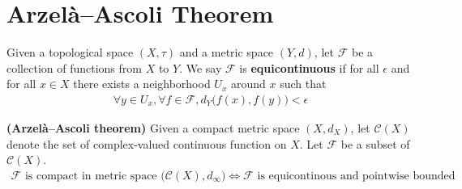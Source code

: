 \documentclass{report}
\begin{document}
\section{Arzelà–Ascoli Theorem}
\begin{mdframed}
Given a topological space $(X,\tau)$ and a metric space $(Y,d)$, let $\mathcal{F}$ be a collection of functions from $X$ to $Y$. We say $\mathcal{F}$ is \textbf{equicontinuous} if for all $\epsilon $ and for all $x \in X$ there exists a neighborhood $U_x$ around  $x$ such that 
\begin{align*}
\forall y \in U_x, \forall f \in \mathcal{F}, d_Y\big(f(x),f(y) \big)<\epsilon 
\end{align*}
\end{mdframed}
\begin{theorem}
\textbf{(Arzelà–Ascoli theorem)} Given a compact metric space $(X,d_X)$, let $\mathcal{C}(X)$ denote the set of complex-valued continuous function on $X$. Let $\mathcal{F}$ be a subset of $\mathcal{C}(X)$. 
\begin{align*}
\mathcal{F}\text{ is compact in metric space }\big(\mathcal{C}(X),d_{\infty} \big)\iff  \mathcal{F}\text{ is equicontinous and pointwise bounded }
\end{align*}
\end{theorem}
\end{document}
